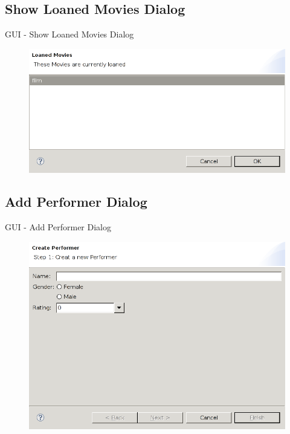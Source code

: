 \documentclass{beamer} %
\begin{document}
	\subsection{Show Loaned Movies Dialog}
	\begin{frame}{GUI - Show Loaned Movies Dialog}
		\begin{figure}[H]
			\centering
			\includegraphics[width=\linewidth]{show-loaned-movies-dialog.png}
		\end{figure}
	\end{frame}

	\subsection{Add Performer Dialog}
	\begin{frame}{GUI - Add Performer Dialog}
		\begin{figure}[H]
			\centering
			\includegraphics[width=\linewidth]{add-performer-dialog.png}
		\end{figure}
	\end{frame}
\end{document}
